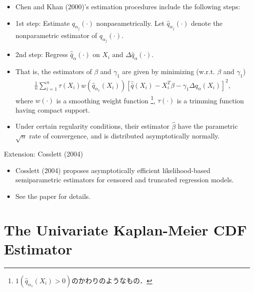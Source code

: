 \documentclass[xcolor=svgnames,dvipdfmx,cjk]{beamer}
\theoremstyle{example}
\begin{document}
\begin{frame}
      \begin{itemize}
            \item Chen and Khan (2000)'s estimation procedures include the following steps:
            \item \alert{1st step}: Estimate $q_{\alpha_j}(\cdot)$ nonpaeametrically. 
                  Let $\hat{q}_{\alpha_j}(\cdot)$ denote the nonparametric estimator of $q_{\alpha_j}(\cdot)$.
            \item \alert{2nd step}: Regress $\hat{\bar{q}}_{\alpha}(\cdot)$ on $X_i$ and $\Delta \hat{q}_{\alpha}(\cdot)$.
            \item That is, the estimators of $\beta$ and $\gamma_1$ are given by minimizing (w.r.t. $\beta$ and $\gamma_1$)
                  \begin{align*}
                        \frac{1}{n} 
                        \sum_{i=1}^n 
                        \tau(X_i) 
                        w\left( \hat{q}_{\alpha_1}(X_i) \right)
                        [ \hat{\bar{q}}(X_i) - X_i^T\beta - \gamma_1 \Delta \hat{q}_{\alpha}(X_i) ]^2 ,
                  \end{align*}
                  where $w(\cdot)$ is a smoothing weight function
                  \footnote{$1( \hat{q}_{\alpha_1}(X_i)>0)$のかわりのようなもの．},
                  $\tau(\cdot)$ is a trimming function having compact support.
            \item Under certain regularity conditions, 
                  their estimator $\hat{\beta}$ have the parametric $\sqrt{n}$ rate of convergence,
                  and is distributed asymptotically normally.
      \end{itemize}
\end{frame}

\begin{frame}{\alert{Extension}: Cosslett (2004)}
      \begin{itemize}
            \item Cosslett (2004) proposes asymptotically efficient likelihood-based semiparametric estimators 
                  for censored and truncated regression models.
            \item See the paper for details. 
      \end{itemize}
\end{frame}


\section{The Univariate Kaplan-Meier CDF Estimator}
\end{document}
